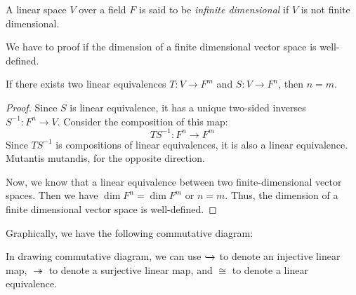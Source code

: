 \documentclass[
	11pt, %
	fleqn, %
	a4paper, %
]{LegrandOrangeBook}
\begin{document}
\begin{definition}
    A linear space $V$ over a field $F$ is said to be \emph{infinite dimensional} if $V$ is not finite dimensional.
\end{definition}

We have to proof if the dimension of a finite dimensional vector space is well-defined.

\begin{proposition}
    If there exists two linear equivalences $T: V \to F^m$ and $S: V \to F^n$, then $n = m$.
\end{proposition}

\begin{proof}
    Since $S$ is linear equivalence, it has a unique two-sided inverses $S^{-1}: F^n \to V$. Consider the composition of this map:
    \[
        TS^{-1}: F^n \to F^m
    \]
    Since $TS^{-1}$ is compositions of linear equivalences, it is also a linear equivalence. Mutantis mutandis, for the opposite direction.

    Now, we know that a linear equivalence between two finite-dimensional vector spaces. Then we have $\dim F^n = \dim F^m$ or $n = m$. Thus, the dimension of a finite dimensional vector space is well-defined.
\end{proof}

Graphically, we have the following commutative diagram:
\begin{center}
\end{center}

\begin{remark}
    In drawing commutative diagram, we can use $\xhookrightarrow{}$ to denote an injective linear map, $\twoheadrightarrow$ to denote a surjective linear map, and $\cong$ to denote a linear equivalence.
\end{remark}

\newpage
\end{document}
